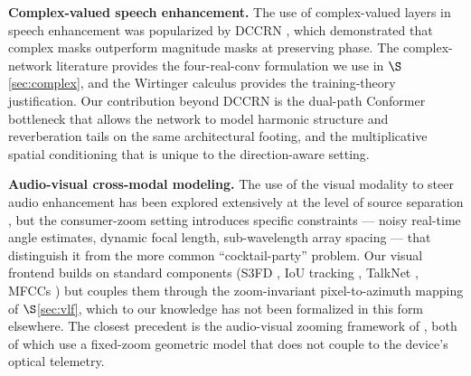 \documentclass[journal,10pt]{IEEEtran}
\begin{document}
\textbf{Complex-valued speech enhancement.} The use of complex-valued layers in speech enhancement was popularized by DCCRN \cite{hu2020dccrn}, which demonstrated that complex masks outperform magnitude masks at preserving phase. The complex-network literature \cite{trabelsi2018deep} provides the four-real-conv formulation we use in \(\S\)\ref{sec:complex}, and the Wirtinger calculus \cite{wirtinger} provides the training-theory justification. Our contribution beyond DCCRN is the dual-path Conformer bottleneck \cite{gulati2020conformer,luo2020dprnn} that allows the network to model harmonic structure and reverberation tails on the same architectural footing, and the multiplicative spatial conditioning that is unique to the direction-aware setting.

\textbf{Audio-visual cross-modal modeling.} The use of the visual modality to steer audio enhancement has been explored extensively at the level of source separation \cite{nair2019audiovisual}, but the consumer-zoom setting introduces specific constraints --- noisy real-time angle estimates, dynamic focal length, sub-wavelength array spacing --- that distinguish it from the more common ``cocktail-party'' problem. Our visual frontend builds on standard components (S3FD \cite{s3fd}, IoU tracking \cite{iou_tracker}, TalkNet \cite{talknet}, MFCCs \cite{mfcc}) but couples them through the zoom-invariant pixel-to-azimuth mapping of \(\S\)\ref{sec:vlf}, which to our knowledge has not been formalized in this form elsewhere. The closest precedent is the audio-visual zooming framework of \cite{nair2019audiovisual,yu2023deep}, both of which use a fixed-zoom geometric model that does not couple to the device's optical telemetry.


\end{document}
